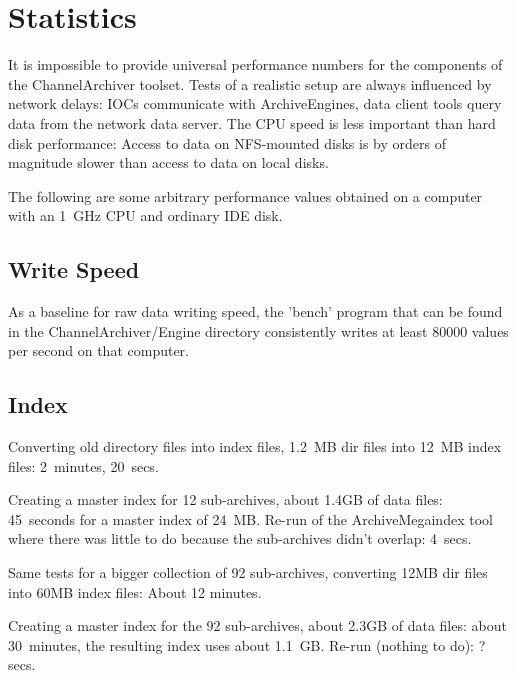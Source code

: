 \section{Statistics}
It is impossible to provide universal performance numbers for the
components of the ChannelArchiver toolset. Tests of a realistic setup
are always influenced by network delays: IOCs communicate with ArchiveEngines,
data client tools query data from the network data server.
The CPU speed is less important than hard disk performance:
Access to data on NFS-mounted disks is by orders of magnitude
slower than access to data on local disks.

The following are some arbitrary performance values obtained on a computer
with an 1~GHz CPU and ordinary IDE disk.
\subsection{Write Speed}
As a baseline for raw data writing speed, the 'bench' program that can
be found in the ChannelArchiver/Engine directory consistently writes
at least 80000 values per second on that computer.

\subsection{Index}
Converting old directory files into index files,
1.2~MB dir files into 12~MB index files: 2~minutes, 20~secs.

Creating a master index for 12 sub-archives,
about 1.4GB of data files: 45~seconds for a master
index of 24~MB.
Re-run of the ArchiveMegaindex tool where there was
little to do because the sub-archives didn't overlap: 4~secs.

Same tests for a bigger collection of 92 sub-archives,
converting 12MB dir files into 60MB index files: About 12 minutes.

Creating a master index for the 92 sub-archives,
about 2.3GB of data files: about 30~minutes, the resulting
index uses about 1.1~GB.
Re-run (nothing to do): ? secs.
